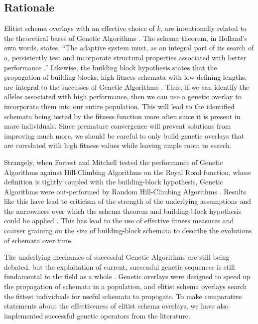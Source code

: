 %
%
%
\subsection*{Rationale}
Elitist schema overlays with an effective choice of $k$, are intentionally related to the theoretical bases of Genetic Algorithms \cite{Goldberg89, Holland75}. The schema theorem, in Holland's own words, states, ``The adaptive system must, as an integral part of its search of $a$, persistently test and incorporate structural properties associated with better performance \cite{Holland75}.'' Likewise, the building block hypothesis states that the propagation of building blocks, high fitness schemata with low defining lengths, are integral to the successes of Genetic Algorithms \cite{Goldberg89}. Thus, if we can identify the alleles associated with high performance, then we can use a genetic overlay to incorporate them into our entire population. This will lead to the identified schemata being tested by the fitness function more often since it is present in more individuals. Since premature convergence will prevent solutions from improving much more, we should be careful to only build genetic overlays that are correlated with high fitness values while leaving ample room to search.

Strangely, when Forrest and Mitchell tested the performance of Genetic Algorithms against Hill-Climbing Algorithms on the Royal Road function, whose definition is tightly coupled with the building-block hypothesis, Genetic Algorithms were out-performed by Random Hill-Climbing Algorithms \cite{Forrest93}. Results like this have lead to criticism of the strength of the underlying assumptions and the narrowness over which the schema theorem and building-block hypothesis could be applied \cite{Burjorjee08, Senaratna05}. This has lead to the use of effective fitness measures and coarser graining on the size of building-block schemata to describe the evolutions of schemata over time\cite{Stephens99}.

The underlying mechanics of successful Genetic Algorithms are still being debated, but the exploitation of current, successful genetic sequences is still fundamental to the field as a whole \cite{Russell10, Senaratna05}. Genetic overlays were designed to speed up the propagation of schemata in a population, and elitist schema overlays search the fittest individuals for useful schemata to propogate. To make comparative statements about the effectiveness of elitist schema overlays, we have also implemented successful genetic operators from the literature.